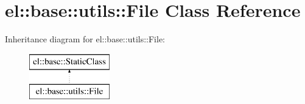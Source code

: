 \hypertarget{classel_1_1base_1_1utils_1_1File}{\section{el\-:\-:base\-:\-:utils\-:\-:File Class Reference}
\label{classel_1_1base_1_1utils_1_1File}
}
Inheritance diagram for el\-:\-:base\-:\-:utils\-:\-:File\-:\begin{figure}[H]
\begin{center}
\leavevmode
\includegraphics[height=2.000000cm]{classel_1_1base_1_1utils_1_1File}
\end{center}
\end{figure}
